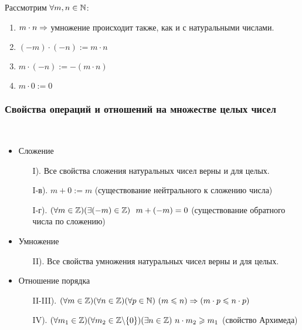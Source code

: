 Рассмотрим $\forall m, n \in \mathbb{N}$:

\begin{enumerate}
    \item $m \cdot n \Rightarrow$ умножение происходит также, как и с натуральными числами.
    \item $(-m) \cdot (-n) := m \cdot n$
    \item $m \cdot (-n) := -(m \cdot n)$
    \item $m \cdot 0 := 0$
\end{enumerate}

\subsubsection*{Свойства операций и отношений на множестве целых чисел}

\begin{theorem}~

    \begin{itemize}
        \item Сложение
        \begin{itemize}
            \item[I).] Все свойства сложения натуральных чисел
                верны и для целых.
            \item[I-в).] $m + 0 := m$ (существование нейтрального
                к сложению числа)
            \item[I-г).] $(\forall m \in \mathbb{Z})(\exists (-m) \in \mathbb{Z})
                \ \ m + (-m) = 0$
                (существование обратного числа по сложению)
        \end{itemize}
        \item Умножение
        \begin{itemize}
            \item[II).] Все свойства умножения натуральных чисел
                верны и для целых.
        \end{itemize}
        \item Отношение порядка
        \begin{itemize}
            \item[II-III).] $(\forall m \in \mathbb{Z}) (\forall n \in \mathbb{Z})
                (\forall p \in \mathbb{N})\ (m \leqslant n) \Rightarrow
                (m \cdot p \leqslant n \cdot p)$
            \item[IV).] $(\forall m_1 \in \mathbb{Z})
                (\forall m_2 \in \mathbb{Z} \backslash \{0\})
                (\exists n \in \mathbb{Z})\ n \cdot m_2
                \geqslant m_1$ (свойство Архимеда)
        \end{itemize}
    \end{itemize}
\end{theorem}

